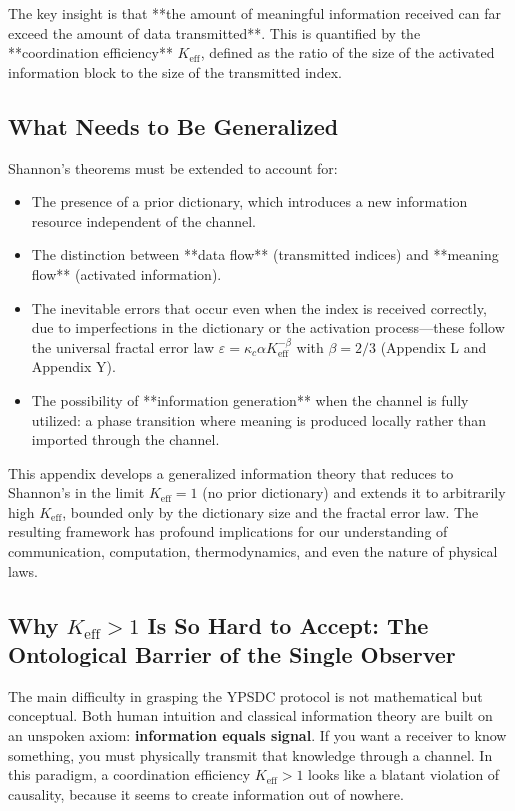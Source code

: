 \documentclass[12pt,a4paper]{article}
\theoremstyle{remark}
\newcommand{\Keff}{K_{\mathrm{eff}}}
\begin{document}
	The key insight is that **the amount of meaningful information received can far exceed the amount of data transmitted**. This is quantified by the **coordination efficiency** $\Keff$, defined as the ratio of the size of the activated information block to the size of the transmitted index.
	
	\subsection{What Needs to Be Generalized}
	
	Shannon's theorems must be extended to account for:
	\begin{itemize}
		\item The presence of a prior dictionary, which introduces a new information resource independent of the channel.
		\item The distinction between **data flow** (transmitted indices) and **meaning flow** (activated information).
		\item The inevitable errors that occur even when the index is received correctly, due to imperfections in the dictionary or the activation process—these follow the universal fractal error law $\varepsilon = \kappa_c\alpha K_{\mathrm{eff}}^{-\beta}$ with $\beta=2/3$ (Appendix L and Appendix Y).
		\item The possibility of **information generation** when the channel is fully utilized: a phase transition where meaning is produced locally rather than imported through the channel.
	\end{itemize}
	
	This appendix develops a generalized information theory that reduces to Shannon's in the limit $\Keff = 1$ (no prior dictionary) and extends it to arbitrarily high $\Keff$, bounded only by the dictionary size and the fractal error law. The resulting framework has profound implications for our understanding of communication, computation, thermodynamics, and even the nature of physical laws.
	
	
	\subsection{Why \(K_{\mathrm{eff}} > 1\) Is So Hard to Accept: 
		The Ontological Barrier of the Single Observer}
	
	The main difficulty in grasping the YPSDC protocol is not
	mathematical but conceptual. Both human intuition and
	classical information theory are built on an unspoken axiom:
	\textbf{information equals signal}. If you want a receiver to
	know something, you must physically transmit that knowledge
	through a channel. In this paradigm, a coordination efficiency
	\(K_{\mathrm{eff}} > 1\) looks like a blatant violation of
	causality, because it seems to create information out of
	nowhere.
	
\end{document}

